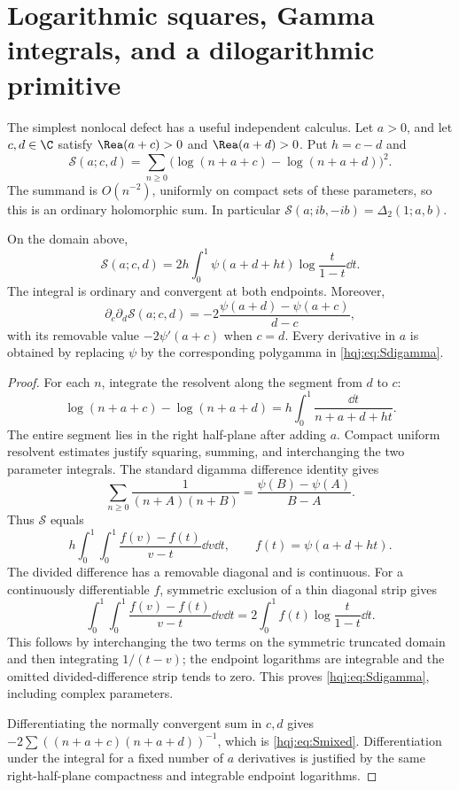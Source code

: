 \section{Logarithmic squares, Gamma integrals, and a dilogarithmic primitive}
\label{hqj:sec:gamma}

The simplest nonlocal defect has a useful independent calculus.
Let $a>0$, and let $c,d\in\C$ satisfy
$\Rea(a+c)>0$ and $\Rea(a+d)>0$. Put $h=c-d$ and
\begin{equation}\label{hqj:eq:Sdef}
\mathscr S(a;c,d)=\sum_{n\ge0}
\bigl(\log(n+a+c)-\log(n+a+d)\bigr)^2.
\end{equation}
The summand is $O(n^{-2})$, uniformly on compact sets of these
parameters, so this is an ordinary holomorphic sum. In particular
$\mathscr S(a;ib,-ib)=\Delta_2(1;a,b)$.

\begin{theorem}\label{hqj:thm:gamma-square}
On the domain above,
\begin{equation}\label{hqj:eq:Sdigamma}
\boxed{\mathscr S(a;c,d)=2h\int_0^1
\psi(a+d+ht)\log\frac{t}{1-t}\dd t.}
\end{equation}
The integral is ordinary and convergent at both endpoints. Moreover,
\begin{equation}\label{hqj:eq:Smixed}
\partial_c\partial_d\mathscr S(a;c,d)
=-2\frac{\psi(a+d)-\psi(a+c)}{d-c},
\end{equation}
with its removable value $-2\psi'(a+c)$ when $c=d$.
Every derivative in $a$ is obtained by replacing $\psi$ by the
corresponding polygamma in \eqref{hqj:eq:Sdigamma}.
\end{theorem}
\begin{proof}
For each $n$, integrate the resolvent along the segment from $d$ to $c$:
\[
\log(n+a+c)-\log(n+a+d)
=h\int_0^1\frac{\dd t}{n+a+d+ht}.
\]
The entire segment lies in the right half-plane after adding $a$.
Compact uniform resolvent estimates justify squaring, summing, and
interchanging the two parameter integrals. The standard digamma
difference identity gives
\[
\sum_{n\ge0}\frac1{(n+A)(n+B)}
=\frac{\psi(B)-\psi(A)}{B-A}.
\]
Thus $\mathscr S$ equals
\[
h\int_0^1\int_0^1
\frac{f(v)-f(t)}{v-t}\dd v\dd t,
\qquad f(t)=\psi(a+d+ht).
\]
The divided difference has a removable diagonal and is continuous.
For a continuously differentiable $f$, symmetric exclusion of a thin
diagonal strip gives
\[
\int_0^1\int_0^1\frac{f(v)-f(t)}{v-t}\dd v\dd t
=2\int_0^1f(t)\log\frac{t}{1-t}\dd t.
\]
This follows by interchanging the two terms on the symmetric truncated
domain and then integrating $1/(t-v)$; the endpoint logarithms are
integrable and the omitted divided-difference strip tends to zero.
This proves \eqref{hqj:eq:Sdigamma}, including complex parameters.

Differentiating the normally convergent sum in $c,d$ gives
$-2\sum((n+a+c)(n+a+d))^{-1}$, which is
\eqref{hqj:eq:Smixed}. Differentiation under the integral for a fixed
number of $a$ derivatives is justified by the same right-half-plane
compactness and integrable endpoint logarithms.
\end{proof}

